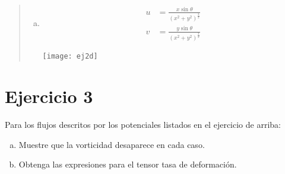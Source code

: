 \documentclass[a4paper,10pt,twoside,final,spanish]{article}
\begin{document}
\begin{quote}
\begin{enumerate}[a)]
\item

\begin{minipage}{0.5\linewidth}

\begin{align*}
u &= \frac{x\sin\theta}{(x^{2}+y^{2})^{\frac{3}{2}}} \\
v &= \frac{y\sin\theta}{(x^{2}+y^{2})^{\frac{3}{2}}}
\end{align*}

\end{minipage} \hfill \begin{minipage}{0.5\linewidth}

\texttt{[image: ej2d]}

\end{minipage}

\end{enumerate}
\end{quote}

\section*{Ejercicio 3}

Para los flujos descritos por los potenciales listados en el ejercicio de arriba:

\begin{enumerate}[a)]
\item Muestre que la vorticidad desaparece en cada caso. 
\item Obtenga las expresiones para el tensor tasa de deformación. 
\end{enumerate}

\dotfill
\end{document}
